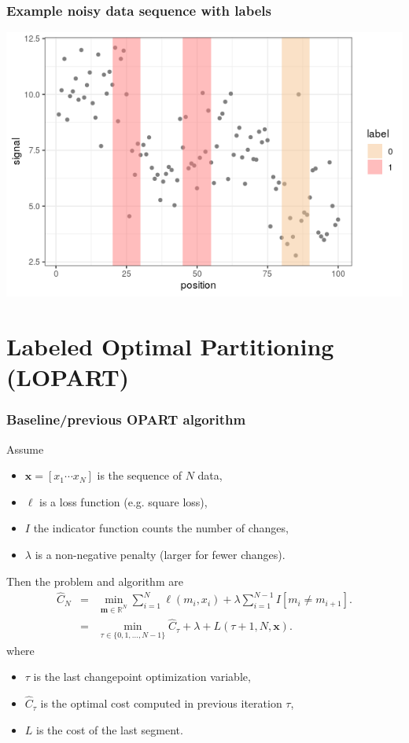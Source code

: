 \documentclass{beamer}
\begin{document}
\begin{frame}
  \frametitle{Example noisy data sequence with labels}

  \includegraphics[width=\textwidth]{figure-baselines-labels}  
  
\end{frame}



\section{Labeled Optimal Partitioning (LOPART)}

\begin{frame}
  \frametitle{Baseline/previous OPART algorithm}

  Assume
  \begin{itemize}
  \item $\mathbf x = [ x_1 \cdots x_N ]$ is the sequence of $N$ data,
  \item $\ell$ is a loss function (e.g. square loss),
  \item $I$ the indicator function counts the number of changes,
  \item $\lambda$ is a non-negative penalty (larger for fewer changes).
  \end{itemize}
  Then the problem and algorithm are
  \begin{eqnarray*}
    \label{eq:op}
    \hat C_N &=& \min_{\mathbf m\in \mathbb R^N}
                 \sum_{i=1}^N \ell(m_i, x_i) + 
                 \lambda \sum_{i=1}^{N-1} I[m_i \neq m_{i+1}].\\
             &=& \min_{\tau\in \{0, 1, \dots, N-1\} }
                 \hat C_\tau +
                 \lambda +
                 L(\tau+1, N, \mathbf x).
                 \label{eq:op-update}
  \end{eqnarray*}
  where
  \begin{itemize}
  \item $\tau$ is the last changepoint optimization variable,
  \item $\hat C_\tau$ is the optimal cost computed in previous iteration $\tau$,
  \item $L$ is the cost of the last segment.
  \end{itemize}

\end{frame}
\end{document}
